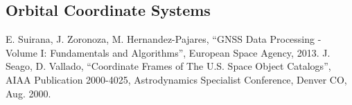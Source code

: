\documentclass [12pt, a4paper] {article}
\begin{document}
\subsection{Orbital Coordinate Systems}

\begin{thebibliography}{1}
  E. Suirana, J. Zoronoza, M. Hernandez-Pajares,
  ``GNSS Data Processing - Volume I: Fundamentals and Algorithms'',
  European Space Agency, 2013.
  J. Seago, D. Vallado,
  ``Coordinate Frames of The U.S. Space Object Catalogs'',
  AIAA Publication 2000-4025,
  Astrodynamics Specialist Conference, Denver CO, Aug. 2000.
\end{thebibliography}  
\end{document}
